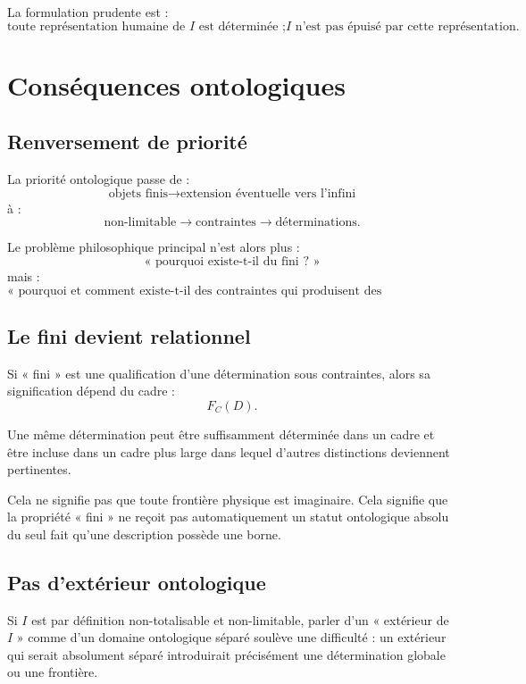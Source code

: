 \documentclass[11pt,a4paper]{article}
\begin{document}
La formulation prudente est :
\[
\boxed{
\text{toute représentation humaine de \(I\) est déterminée ;
\(I\) n'est pas épuisé par cette représentation.}
}
\]

\section{Conséquences ontologiques}

\subsection{Renversement de priorité}

La priorité ontologique passe de :
\[
\text{objets finis}\to\text{extension éventuelle vers l'infini}
\]
à :
\[
\boxed{
\text{non-limitable}\to\text{contraintes}\to\text{déterminations}.
}
\]

Le problème philosophique principal n'est alors plus :
\[
\text{« pourquoi existe-t-il du fini ? »}
\]
mais :
\[
\boxed{
\text{« pourquoi et comment existe-t-il des contraintes qui produisent des déterminations ? »}
}
\]

\subsection{Le fini devient relationnel}

Si « fini » est une qualification d'une détermination sous contraintes, alors
sa signification dépend du cadre :
\[
F_C(D).
\]

Une même détermination peut être suffisamment déterminée dans un cadre et
être incluse dans un cadre plus large dans lequel d'autres distinctions
deviennent pertinentes.

Cela ne signifie pas que toute frontière physique est imaginaire. Cela
signifie que la propriété « fini » ne reçoit pas automatiquement un statut
ontologique absolu du seul fait qu'une description possède une borne.

\subsection{Pas d'extérieur ontologique}

Si \(I\) est par définition non-totalisable et non-limitable, parler d'un
« extérieur de \(I\) » comme d'un domaine ontologique séparé soulève une
difficulté : un extérieur qui serait absolument séparé introduirait
précisément une détermination globale ou une frontière.
\end{document}
